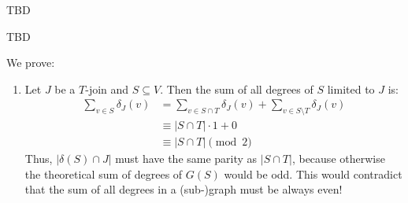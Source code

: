 \begin{aufgabe}
    TBD
\end{aufgabe}
\begin{aufgabe}
    TBD
\end{aufgabe}
\begin{aufgabe} \label{ex:8.3}
    We prove:
    \begin{enumerate}[label=(\alph*)]
        \item Let $J$ be a $T$-join and $S \subseteq V$.
              Then the sum of all degrees of $S$ limited to $J$ is:
              \begin{align*}
                  \sum_{v \in S} \delta_J(v) & = \sum_{v \in S \cap T} \delta_J(v) + \sum_{v \in S \setminus T} \delta_J(v) \\
                                             & \equiv |S \cap T| \cdot 1 + 0                                                \\
                                             & \equiv |S \cap T|   \pmod{2}
              \end{align*}
              Thus, $|\delta(S) \cap J|$ must have the same parity as $|S \cap T|$,
              because otherwise the theoretical sum of degrees of $G(S)$ would be odd.
              This would contradict that the sum of all degrees in a (sub-)graph must be always even!


\end{enumerate}
\end{aufgabe}
